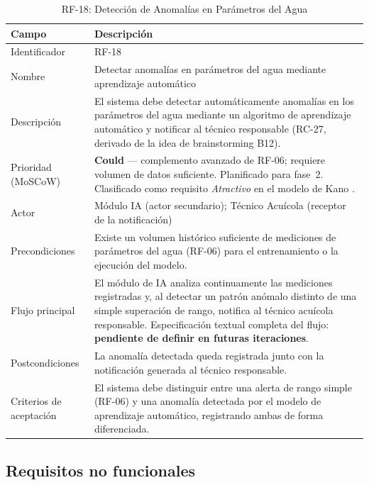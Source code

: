 \documentclass[12pt,a4paper]{article}
\begin{document}
\begin{table}[H]
\centering
\caption{RF-18: Detección de Anomalías en Parámetros del Agua}
\begin{tabular}{|p{3.6cm}|p{10.4cm}|}
\hline
\textbf{Campo} & \textbf{Descripción} \\
\hline
Identificador & RF-18 \\ \hline
Nombre & Detectar anomalías en parámetros del agua mediante aprendizaje
automático \\ \hline
Descripción & El sistema debe detectar automáticamente anomalías en los
parámetros del agua mediante un algoritmo de aprendizaje automático y
notificar al técnico responsable (RC-27, derivado de la idea de brainstorming
B12). \\ \hline
Prioridad (MoSCoW) & \textbf{Could} --- complemento avanzado de RF-06; requiere
volumen de datos suficiente. Planificado para fase~2. Clasificado como
requisito \textit{Atractivo} en el modelo de Kano \cite{Pohl2010}. \\ \hline
Actor & Módulo IA (actor secundario); Técnico Acuícola (receptor de la
notificación) \\ \hline
Precondiciones & Existe un volumen histórico suficiente de mediciones de
parámetros del agua (RF-06) para el entrenamiento o la ejecución del modelo. \\ \hline
Flujo principal & El módulo de IA analiza continuamente las mediciones
registradas y, al detectar un patrón anómalo distinto de una simple superación
de rango, notifica al técnico acuícola responsable. Especificación textual
completa del flujo: \textbf{pendiente de definir en futuras iteraciones}. \\ \hline
Postcondiciones & La anomalía detectada queda registrada junto con la
notificación generada al técnico responsable. \\ \hline
Criterios de aceptación & El sistema debe distinguir entre una alerta de rango
simple (RF-06) y una anomalía detectada por el modelo de aprendizaje
automático, registrando ambas de forma diferenciada. \\ \hline
\end{tabular}
\end{table}


\subsection{Requisitos no funcionales}
\end{document}
